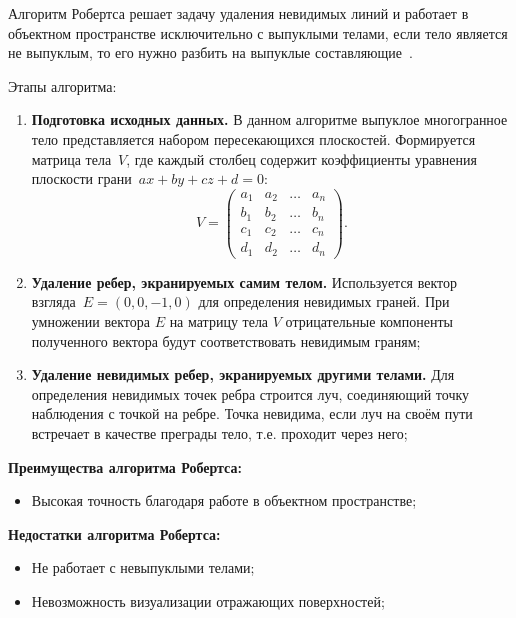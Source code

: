 Алгоритм Робертса решает задачу удаления невидимых линий и работает в объектном пространстве исключительно с выпуклыми телами, если тело является не выпуклым, то его нужно разбить на выпуклые составляющие~\cite{rodgersCG}.

Этапы алгоритма:
\begin{enumerate}[label=\arabic*)]
	\item \textbf{Подготовка исходных данных.} В данном алгоритме выпуклое многогранное тело представляется набором пересекающихся плоскостей. Формируется матрица тела~$V$, где каждый столбец содержит коэффициенты уравнения плоскости грани~$ax + by + cz + d = 0$:
	\begin{equation}
		V = \begin{pmatrix}
			a_{1} & a_{2} & \ldots & a_{n}\\
			b_{1} & b_{2} & \ldots & b_{n}\\
			c_{1} & c_{2} & \ldots & c_{n}\\
			d_{1} & d_{2} & \ldots & d_{n}
		\end{pmatrix}.
	\end{equation}
	\item \textbf{Удаление ребер, экранируемых самим телом.} Используется вектор взгляда~$E = (0, 0, -1, 0)$ для определения невидимых граней. При умножении вектора $E$ на матрицу тела $V$ отрицательные компоненты полученного вектора будут соответствовать невидимым граням;
	
	\item \textbf{Удаление невидимых ребер, экранируемых другими телами.} Для определения невидимых точек ребра строится луч, соединяющий точку наблюдения с точкой на ребре. Точка невидима, если луч на своём пути встречает в качестве преграды тело, т.е. проходит через него;
\end{enumerate}

\textbf{Преимущества алгоритма Робертса:}
\begin{itemize}
	\item Высокая точность благодаря работе в объектном пространстве;
\end{itemize}

\textbf{Недостатки алгоритма Робертса:}
\begin{itemize}
	\item Не работает с невыпуклыми телами;
	\item Невозможность визуализации отражающих поверхностей;
\end{itemize}


